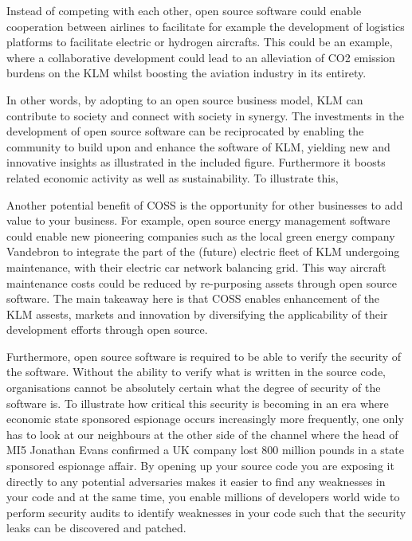 \documentclass[portrait,a0paper]{rudi-poster}  %
\begin{document}
\begin{rudiblockimethodsresultsbody}
    \begin{multicols}{3}
    Instead of competing with each other, open source software could enable cooperation between airlines to facilitate for example the development of logistics platforms to facilitate electric or hydrogen aircrafts. This could be an example, where a collaborative development could lead to an alleviation of CO2 emission burdens on the KLM whilst boosting the aviation industry in its entirety.
    
    In other words, by adopting to an open source business model, KLM can contribute to society and connect with society in synergy. The investments in the development of open source software can be reciprocated by enabling the community to build upon and enhance the software of KLM, yielding new and innovative insights as illustrated in the included figure. Furthermore it boosts related economic activity as well as sustainability. To illustrate this, 
    
    \indent Another potential benefit of COSS is the opportunity for other businesses to add value to your business. For example, open source energy management software could enable new pioneering companies such as the local green energy company Vandebron to integrate the part of the (future) electric fleet of KLM undergoing maintenance, with their electric car network balancing grid. This way aircraft maintenance costs could be reduced by re-purposing assets through open source software. The main takeaway here is that COSS enables enhancement of the KLM assests, markets and innovation by diversifying the applicability of their development efforts through open source.

    \indent Furthermore, open source software is required to be able to verify the security of the software. Without the ability to verify what is written in the source code, organisations cannot be absolutely certain what the degree of security of the software is. To illustrate how critical this security is becoming in an era where economic state sponsored espionage occurs increasingly more frequently, one only has to look at our neighbours at the other side of the channel where the head of MI5 Jonathan Evans confirmed a UK company lost 800 million pounds in a state sponsored espionage affair. By opening up your source code you are exposing it directly to any potential adversaries makes it easier to find any weaknesses in your code and at the same time, you enable millions of developers world wide to perform security audits to identify weaknesses in your code such that the security leaks can be discovered and patched. 
    

\end{multicols}
\end{rudiblockimethodsresultsbody}
\end{document}
